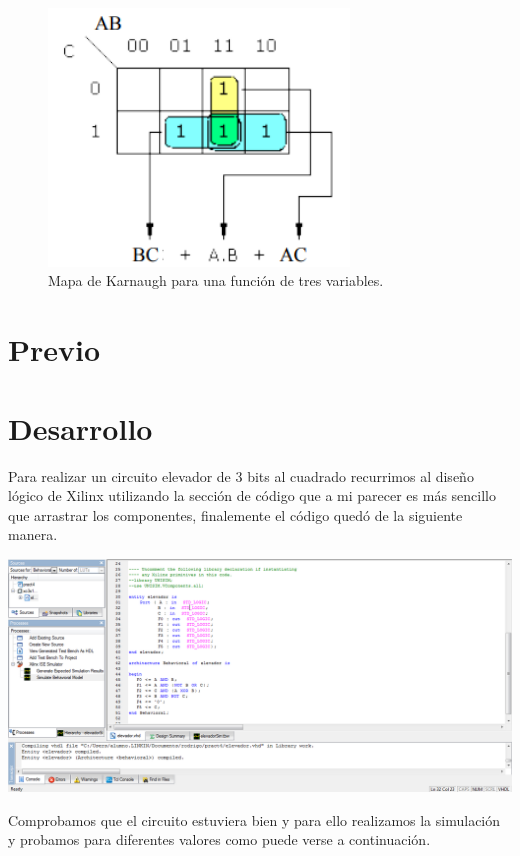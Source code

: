 \documentclass{mylib/reporteConCalif}
\begin{document}
\begin{figure}[H]
	\centering
	\includegraphics[width=8cm]{img/labdise_pract5/mapa-kv}
	\caption{Mapa de Karnaugh para una función de tres variables.}
\end{figure}

\newpage
\section{Previo}

\newpage
\section{Desarrollo}

Para realizar un circuito elevador de 3 bits al cuadrado recurrimos al diseño lógico de Xilinx utilizando la sección de código que a mi parecer es más sencillo que arrastrar los componentes, finalemente el código quedó de la siguiente manera.\\

\begin{center}
	\includegraphics[width=15cm]{img/labdise_pract4/r4_img1}
\end{center}

Comprobamos que el circuito estuviera bien y para ello realizamos la simulación y probamos para diferentes valores como puede verse a continuación.\\
\end{document}
